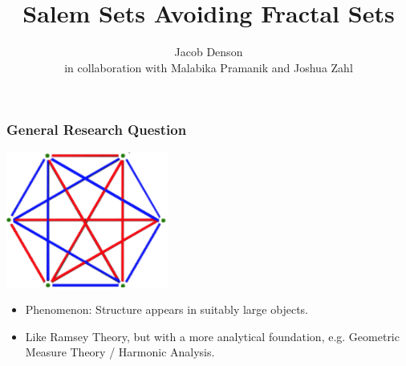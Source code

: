 \documentclass[usenames,dvipsnames]{beamer}
\title{Salem Sets Avoiding Fractal Sets}
\author{Jacob Denson\\ \footnotesize in collaboration with Malabika Pramanik and Joshua Zahl}
\institute{}
\begin{document}
\maketitle




\begin{frame}
    \frametitle{General Research Question}

    \begin{center}
    \includegraphics[width=0.4\textwidth]{../Images/RamseyTheory}
    \end{center}

    \begin{itemize}
        \item Phenomenon: Structure appears in suitably large objects.

        \item Like Ramsey Theory, but with a more analytical foundation, e.g. Geometric Measure Theory / Harmonic Analysis.
    \end{itemize}
\end{frame}
\end{document}
